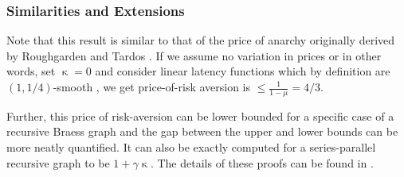 \subsubsection{Similarities and Extensions} Note that this result is similar to that of the price of anarchy originally derived by Roughgarden and Tardos \cite{tardos}. If we assume no variation in prices or in other words, 
set $\upkappa = 0$ and consider linear latency functions which by definition are $(1, 1/4)$-smooth \cite{tardos-notes}, we get price-of-risk aversion is $\leq \displaystyle \frac{1}{1 - \mu} = 4/3$.

Further, this price of risk-aversion can be lower bounded for a specific case of a recursive Braess graph  and the gap between the upper and
lower bounds can be more neatly quantified. It can also be exactly computed for a series-parallel recursive graph to be $1 + \gamma \upkappa$. The details of these proofs can be found
in \cite{risk-averse}.
